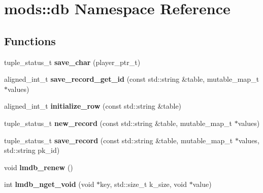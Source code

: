 \hypertarget{namespacemods_1_1db}{}\section{mods\+:\+:db Namespace Reference}
\label{namespacemods_1_1db}
\subsection*{Functions}
\begin{DoxyCompactItemize}
\item 
\mbox{\label{namespacemods_1_1db_ab9042a10599aa69b010be801966a2f2e}} 
tuple\+\_\+status\+\_\+t {\bfseries save\+\_\+char} (player\+\_\+ptr\+\_\+t)
\item 
\mbox{\label{namespacemods_1_1db_a56d7528778e7fa35943fb30006046f54}} 
aligned\+\_\+int\+\_\+t {\bfseries save\+\_\+record\+\_\+get\+\_\+id} (const std\+::string \&table, mutable\+\_\+map\+\_\+t $\ast$values)
\item 
\mbox{\label{namespacemods_1_1db_ae6cd02ca445ea237caf3b63fd5c7c36b}} 
aligned\+\_\+int\+\_\+t {\bfseries initialize\+\_\+row} (const std\+::string \&table)
\item 
\mbox{\label{namespacemods_1_1db_a77cb9fac2dd8aad01191849ceedff9ab}} 
tuple\+\_\+status\+\_\+t {\bfseries new\+\_\+record} (const std\+::string \&table, mutable\+\_\+map\+\_\+t $\ast$values)
\item 
\mbox{\label{namespacemods_1_1db_af5d88db0c82983fcb247497adeeec339}} 
tuple\+\_\+status\+\_\+t {\bfseries save\+\_\+record} (const std\+::string \&table, mutable\+\_\+map\+\_\+t $\ast$values, std\+::string pk\+\_\+id)
\item 
\mbox{\label{namespacemods_1_1db_afd5c08c56ba18bdd8c650d8d7345ad7f}} 
void {\bfseries lmdb\+\_\+renew} ()
\item 
\mbox{\label{namespacemods_1_1db_a2964d817c59b9a29ac62f0e67e080254}} 
int {\bfseries lmdb\+\_\+nget\+\_\+void} (void $\ast$key, std\+::size\+\_\+t k\+\_\+size, void $\ast$value)
\item 
\mbox{\label{namespacemods_1_1db_a72e95918c9bc92bd82716f200f81eec5}} 

\end{DoxyCompactItemize}
